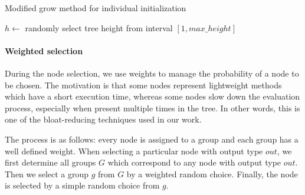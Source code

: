 \begin{algorithm}[t]
\DontPrintSemicolon 
\caption{Modified grow method for individual initialization\label{alg:ourgrow}}
  \;
  $h \longleftarrow$ randomly select tree height from interval $[1, max\_height]$ \label{alg:ourgrow:height}
  \;  
  
  \;
  
\end{algorithm}

\paragraph{Weighted selection}
During the node selection, we use weights to manage the probability of a node
to be chosen. The motivation is that some nodes represent lightweight methods
which have a short execution time, whereas some nodes slow down the evaluation
process, especially when present multiple times in the tree. In other words, this is
one of the bloat-reducing techniques used in our work.

The process is as follows: every node is assigned to a group and each group has
a well defined weight. When selecting a particular node with output type $out$, we 
first determine all groups $G$ which correspond to any node with output type
$out$. Then we select a group $g$ from $G$ by a weighted random choice.
Finally, the node is selected by a simple random choice from $g$.

